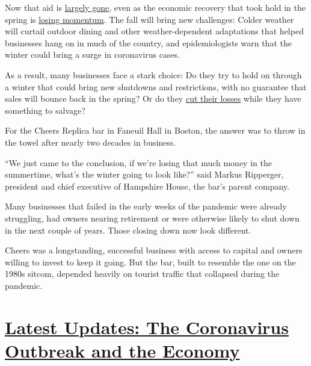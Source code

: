 Now that aid is
\href{https://www.nytimes3xbfgragh.onion/2020/08/06/business/small-businesses-relief-program-ending.html}{largely
gone}, even as the economic recovery that took hold in the spring is
\href{https://www.nytimes3xbfgragh.onion/2020/08/25/business/american-airline-furlough-19000.html}{losing
momentum}. The fall will bring new challenges: Colder weather will
curtail outdoor dining and other weather-dependent adaptations that
helped businesses hang on in much of the country, and epidemiologists
warn that the winter could bring a surge in coronavirus cases.

As a result, many businesses face a stark choice: Do they try to hold on
through a winter that could bring new shutdowns and restrictions, with
no guarantee that sales will bounce back in the spring? Or do they
\href{https://www.nytimes3xbfgragh.onion/2020/08/03/nyregion/nyc-small-businesses-closing-coronavirus.html}{cut
their losses} while they have something to salvage?

For the Cheers Replica bar in Faneuil Hall in Boston, the answer was to
throw in the towel after nearly two decades in business.

``We just came to the conclusion, if we're losing that much money in the
summertime, what's the winter going to look like?'' said Markus
Ripperger, president and chief executive of Hampshire House, the bar's
parent company.

Many businesses that failed in the early weeks of the pandemic were
already struggling, had owners nearing retirement or were otherwise
likely to shut down in the next couple of years. Those closing down now
look different.

Cheers was a longstanding, successful business with access to capital
and owners willing to invest to keep it going. But the bar, built to
resemble the one on the 1980s sitcom, depended heavily on tourist
traffic that collapsed during the pandemic.

\hypertarget{latest-updates-the-coronavirus-outbreak-and-the-economy}{%
\section{\texorpdfstring{\href{https://www.nytimes3xbfgragh.onion/live/2020/09/11/business/stock-market-today-coronavirus?action=click\&pgtype=Article\&state=default\&region=MAIN_CONTENT_1\&context=storylines_live_updates}{Latest
Updates: The Coronavirus Outbreak and the
Economy}}{Latest Updates: The Coronavirus Outbreak and the Economy}}\label{latest-updates-the-coronavirus-outbreak-and-the-economy}}


